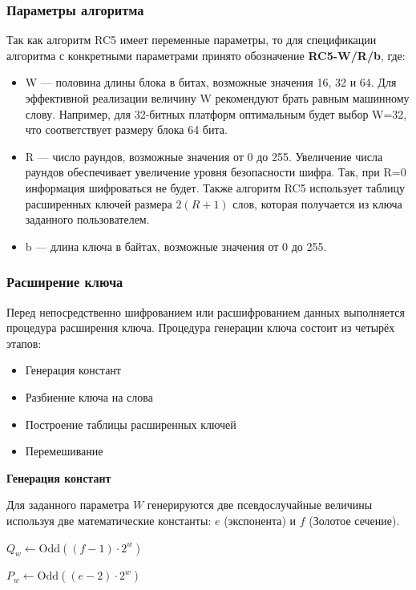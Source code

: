 \documentclass[a4paper]{report}
\begin{document}
\subsubsection{Параметры алгоритма}
Так как алгоритм RC5 имеет переменные параметры, то для спецификации алгоритма с конкретными параметрами принято обозначение \textbf{RC5-W/R/b}, где:
\begin{itemize}
\item W — половина длины блока в битах, возможные значения 16, 32 и 64. Для эффективной реализации величину W рекомендуют брать равным машинному слову. Например, для 32-битных платформ оптимальным будет выбор W=32, что соответствует размеру блока 64 бита.
\item R — число раундов, возможные значения от 0 до 255. Увеличение числа раундов обеспечивает увеличение уровня безопасности шифра. Так, при R=0 информация шифроваться не будет. Также алгоритм RC5 использует таблицу расширенных ключей размера $\displaystyle 2(R+1)$ слов, которая получается из ключа заданного пользователем.
\item b — длина ключа в байтах, возможные значения от 0 до 255.
\end{itemize} 


\subsubsection{Расширение ключа}
Перед непосредственно шифрованием или расшифрованием данных выполняется процедура расширения ключа. Процедура генерации ключа состоит из четырёх этапов: 

\begin{itemize}

\item Генерация констант
\item Разбиение ключа на слова
\item Построение таблицы расширенных ключей
\item Перемешивание

\end{itemize}

\textbf{Генерация констант}

Для заданного параметра $W$ генерируются две псевдослучайные величины используя две математические константы: $e$ (экспонента) и $f$ (Золотое сечение).

$Q_w \leftarrow \textrm{Odd}((f − 1)\cdot 2^w)$

$P_w \leftarrow \textrm{Odd}((e − 2)\cdot 2^w)$
\end{document}
